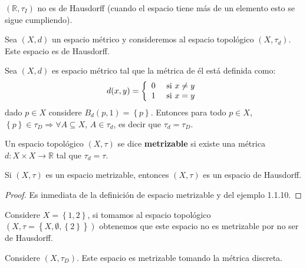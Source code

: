 \documentclass[12pt]{report}
\theoremstyle{largebreak}
\newcommand\cf[3]{\ensuremath{#1:#2\rightarrow#3}}
\begin{document}
    \begin{exa}
        $(\mathbb{R},\tau_I)$ no es de Hausdorff (cuando el espacio tiene más de un elemento esto se sigue cumpliendo).
    \end{exa}

    \begin{exa}
        Sea $(X,d)$ un espacio métrico y consideremos al espacio topológico $(X,\tau_d)$. Este espacio es de Hausdorff.
    \end{exa}

    \begin{exa}
        Sea $(X,d)$ es espacio métrico tal que la métrica de él está definida como:
        \begin{equation*}
            d(x,y)=\left\{
            \begin{array}{lr}
                0 & \textup{ si }x\neq y\\
                1 & \textup{ si }x = y\\
            \end{array}
            \right.
        \end{equation*}
        dado $p\in X$ considere $B_d(p,1)=\left\{p\right\}$. Entonces para todo $p\in X$, $\left\{p\right\}\in\tau_D\Rightarrow \forall A\subseteq X$, $A\in\tau_d$, es decir que $\tau_d=\tau_D$. 
    \end{exa}

    \begin{mydef}
        Un espacio topológico $(X,\tau)$ se dice \textbf{metrizable} si existe una métrica $\cf{d}{X\times X}{\mathbb{R}}$ tal que $\tau_d=\tau$. 
    \end{mydef}

    \begin{propo}
        Si $(X,\tau)$ es un espacio metrizable, entonces $(X,\tau)$ es un espacio de Hausdorff.
    \end{propo}

    \begin{proof}
        Es inmediata de la definición de espacio metrizable y del ejemplo 1.1.10.
    \end{proof}

    \begin{exa}
        Considere $X=\left\{1,2\right\}$, si tomamos al espacio topológico $(X,\tau=\left\{X,\emptyset,\left\{2\right\} \right\})$ obtenemos que este espacio no es metrizable por no ser de Hausdorff.
    \end{exa}

    \begin{exa}
        Considere $(X,\tau_D)$. Este espacio es metrizable tomando la métrica discreta.
    \end{exa}
\end{document}
